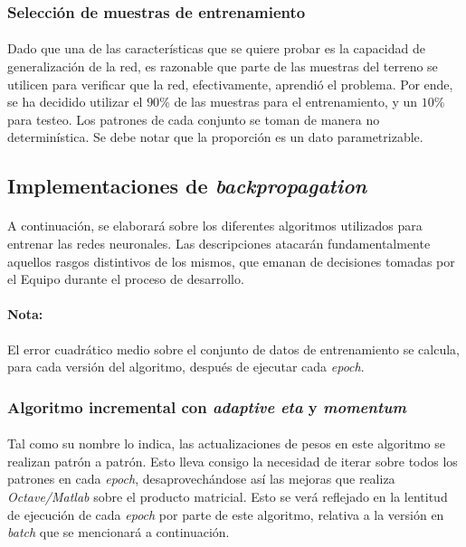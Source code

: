 \documentclass[12pt, twocolumn]{article}
\begin{document}
	\subsubsection{Selección de muestras de entrenamiento}
	
	\paragraph{} Dado que una de las características que se quiere probar es la capacidad de generalización de la red, es razonable que parte de las muestras del terreno se utilicen para verificar que la red, efectivamente, aprendió el problema. Por ende, se ha decidido utilizar el $90\%$ de las muestras para el entrenamiento, y un $10\%$ para testeo. Los patrones de cada conjunto se toman de manera no determinística. Se debe notar que la proporción es un dato parametrizable. 
	
	\subsection{Implementaciones de \textit{backpropagation}}
	
	\paragraph{} A continuación, se elaborará sobre los diferentes algoritmos utilizados para entrenar las redes neuronales. Las descripciones atacarán fundamentalmente aquellos rasgos distintivos de los mismos, que emanan de decisiones tomadas por el Equipo durante el proceso de desarrollo.
	
	\paragraph{Nota:} El error cuadrático medio sobre el conjunto de datos de entrenamiento se calcula, para cada versión del algoritmo, después de ejecutar cada \textit{epoch}.
	
	\subsubsection{Algoritmo incremental con \textit{adaptive eta} y \textit{momentum}}
	
	\paragraph{} Tal como su nombre lo indica, las actualizaciones de pesos en este algoritmo se realizan patrón a patrón. Esto lleva consigo la necesidad de iterar sobre todos los patrones en cada \textit{epoch}, desaprovechándose así las mejoras que realiza \textit{Octave/Matlab} sobre el producto matricial. Esto se verá reflejado en la lentitud de ejecución de cada \textit{epoch} por parte de este algoritmo, relativa a la versión en \textit{batch} que se mencionará a continuación.
	
\end{document}
